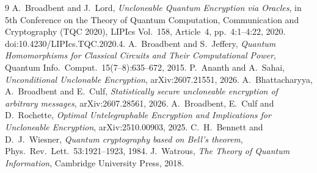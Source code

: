 \documentclass[11pt]{article}
\theoremstyle{definition}
\begin{document}
\begin{thebibliography}{9}
 A.\ Broadbent and J.\ Lord, \emph{Uncloneable Quantum Encryption
via Oracles}, in 5th Conference on the Theory of Quantum Computation,
Communication and Cryptography (TQC 2020), LIPIcs Vol.~158, Article~4,
pp.~4:1--4:22, 2020. doi:10.4230/LIPIcs.TQC.2020.4.
 A.\ Broadbent and S.\ Jeffery, \emph{Quantum Homomorphisms for
Classical Circuits and Their Computational Power}, Quantum Info.\ Comput.\
15(7--8):635--672, 2015.
 P.\ Ananth and A.\ Sahai, \emph{Unconditional Unclonable
Encryption}, arXiv:2607.21551, 2026.
 A.\ Bhattacharyya, A.\ Broadbent and E.\ Culf, \emph{Statistically
secure uncloneable encryption of arbitrary messages}, arXiv:2607.28561, 2026.
\bibitem{bcr26} A.\ Broadbent, E.\ Culf and D.\ Rochette, \emph{Optimal
Untelegraphable Encryption and Implications for Uncloneable Encryption},
arXiv:2510.00903, 2025.
 C.\ H.\ Bennett and D.\ J.\ Wiesner, \emph{Quantum cryptography
based on Bell's theorem}, Phys.\ Rev.\ Lett.\ 53:1921--1923, 1984.
\bibitem{watrous} J.\ Watrous, \emph{The Theory of Quantum Information},
Cambridge University Press, 2018.
\end{thebibliography}
\end{document}
